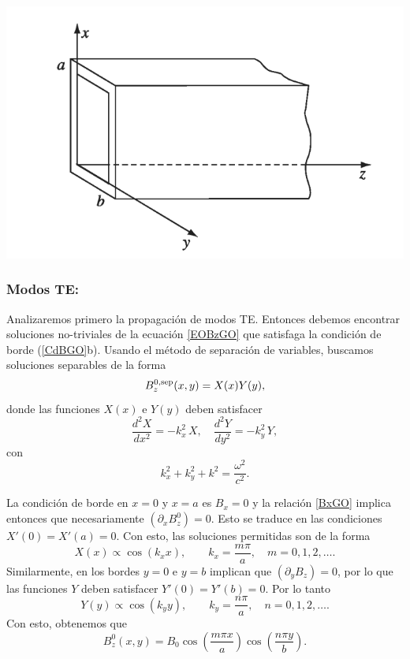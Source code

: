 \begin{center}
\includegraphics[scale=0.4]{fig/fig-guia-onda-rectangular.png}
\end{center}

\subsubsection{Modos TE:} Analizaremos primero la propagación de modos TE. Entonces debemos encontrar soluciones no-triviales de la ecuación \eqref{EOBzGO} que satisfaga la condición de borde (\ref{CdBGO}b). Usando el método de separación de variables, buscamos soluciones separables de la forma
\begin{equation}
B_z^{0,\rm sep}(x, y) = X(x) Y(y),
\end{equation}
donde las funciones $X(x)$ e $Y(y)$ deben satisfacer
\begin{equation}
\frac{d^2 X}{dx^2} = -k_x^2\,X, \quad \frac{d^2 Y}{dy^2} = -k_y^2\,Y,
\end{equation}
con
\begin{equation}\label{RelDispGOR}
k_x^2 + k_y^2  +k^2 = \frac{\omega^2}{c^2}.
\end{equation} 

La condición de borde en $x=0$ y $x=a$ es $B_x=0$ y la relación \eqref{BxGO} implica entonces que necesariamente $(\partial_xB^0_z)=0$. Esto se traduce en las condiciones $X'(0)=X'(a)=0$. Con esto, las soluciones permitidas son de la forma
\begin{equation}
X(x) \propto \cos(k_x x), \qquad k_x = \frac{m\pi}{a}, \quad m=0,1,2,\dots.
\end{equation}
Similarmente, en los bordes $y=0$ e $y=b$ implican que $(\partial_yB_z)=0$, por lo que las funciones $Y$ deben satisfacer $Y'(0)=Y'(b)=0$. Por lo tanto
\begin{equation}
Y(y) \propto \cos(k_y y), \qquad k_y = \frac{n\pi}{a}, \quad n=0,1,2,\dots.
\end{equation}
Con esto, obtenemos que
\begin{equation}
B^0_z(x, y) = B_0 \cos\left(\frac{m \pi x}{a}\right) \cos\left(\frac{n \pi y}{b}\right).
\end{equation}

